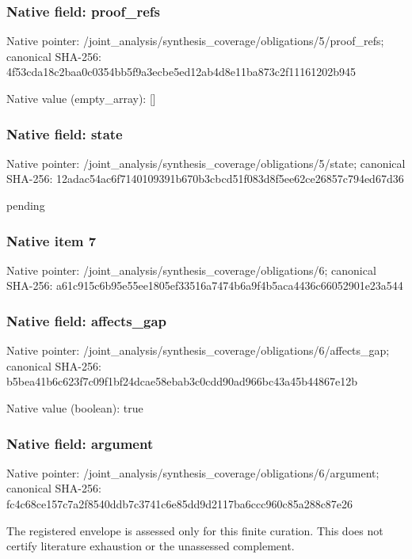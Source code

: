 \documentclass[10pt,a4paper]{article}
\begin{document}
\subsubsection{Native field: proof\_\allowbreak{}refs}
Native pointer: /joint\_\allowbreak{}analysis/synthesis\_\allowbreak{}coverage/obligations/5/proof\_\allowbreak{}refs; canonical SHA-256: 4f53cda18c2baa0c0354bb5f9a3ecbe5ed12ab4d8e11ba873c2f11161202b945

Native value (empty\_\allowbreak{}array): []

\subsubsection{Native field: state}
Native pointer: /joint\_\allowbreak{}analysis/synthesis\_\allowbreak{}coverage/obligations/5/state; canonical SHA-256: 12adac54ac6f7140109391b670b3cbcd51f083d8f5ee62ce26857c794ed67d36

\begingroup\raggedright\sloppy pending\par\endgroup

\subsubsection{Native item 7}
Native pointer: /joint\_\allowbreak{}analysis/synthesis\_\allowbreak{}coverage/obligations/6; canonical SHA-256: a61c915c6b95e55ee1805ef33516a7474b6a9f4b5aca4436c66052901e23a544

\subsubsection{Native field: affects\_\allowbreak{}gap}
Native pointer: /joint\_\allowbreak{}analysis/synthesis\_\allowbreak{}coverage/obligations/6/affects\_\allowbreak{}gap; canonical SHA-256: b5bea41b6c623f7c09f1bf24dcae58ebab3c0cdd90ad966bc43a45b44867e12b

Native value (boolean): true

\subsubsection{Native field: argument}
Native pointer: /joint\_\allowbreak{}analysis/synthesis\_\allowbreak{}coverage/obligations/6/argument; canonical SHA-256: fc4c68ce157c7a2f8540ddb7c3741c6e85dd9d2117ba6ccc960c85a288c87e26

\begingroup\raggedright\sloppy The registered envelope is assessed only for this finite curation. This does not certify literature exhaustion or the unassessed complement.\par\endgroup
\end{document}
